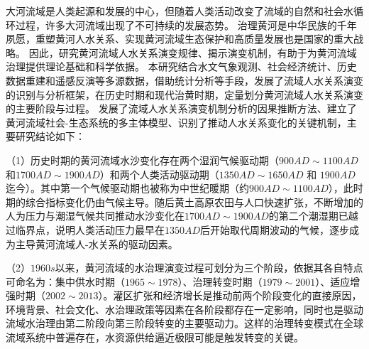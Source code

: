 \begin{cabstract}



大河流域是人类起源和发展的中心，但随着人类活动改变了流域的自然和社会水循环过程，许多大河流域出现了不可持续的发展态势。
治理黄河是中华民族的千年夙愿，重塑黄河人水关系、实现黄河流域生态保护和高质量发展也是国家的重大战略。
因此，研究黄河流域人水关系演变规律、揭示演变机制，有助于为黄河流域治理提供理论基础和科学依据。
本研究结合水文气象观测、社会经济统计、历史数据重建和遥感反演等多源数据，借助统计分析等手段，发展了流域人水关系演变的识别与分析框架，在历史时期和现代治黄时期，定量划分黄河流域人水关系演变的主要阶段与过程。
发展了流域人水关系演变机制分析的因果推断方法、建立了黄河流域社会-生态系统的多主体模型、识别了推动人水关系变化的关键机制，主要研究结论如下：

（1）历史时期的黄河流域水沙变化存在两个湿润气候驱动期（$900AD\sim1100AD$和$1700AD\sim1900AD$）和两个人类活动驱动期（$1350AD \sim 1650AD$ 和 $1900AD$迄今）。其中第一个气候驱动期也被称为中世纪暖期（约$900AD \sim 1100AD$），此时期的综合指标变化仍由气候主导。随后黄土高原农田与人口快速扩张，不断增加的人为压力与潮湿气候共同推动水沙变化在$1700AD \sim 1900AD$的第二个潮湿期已越过临界点，说明人类活动压力最早在$1350AD$后开始取代周期波动的气候，逐步成为主导黄河流域人-水关系的驱动因素。

（2）$1960s$以来，黄河流域的水治理演变过程可划分为三个阶段，依据其各自特点可命名为：集中供水时期（$1965 \sim 1978$）、治理转变时期（$1979 \sim 2001$）、适应增强时期（$2002 \sim 2013$）。灌区扩张和经济增长是推动前两个阶段变化的直接原因，环境背景、社会文化、水治理政策等因素在各阶段都存在一定影响，同时也是驱动流域水治理由第二阶段向第三阶段转变的主要驱动力。这样的治理转变模式在全球流域系统中普遍存在，水资源供给逼近极限可能是触发转变的关键。


\end{cabstract}

